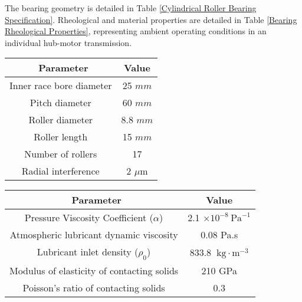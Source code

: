 The bearing geometry is detailed in Table \ref{Cylindrical Roller Bearing Specification}. Rheological and material properties are detailed in Table \ref{Bearing Rheological Properties}, representing ambient operating conditions in an individual hub-motor transmission. 

\begin{table*}
	\caption{Cylindrical Roller Bearing Specification}
	\label{Cylindrical Roller Bearing Specification}
	\centering
	\renewcommand{\arraystretch}{1.5}%
	\begin{tabular}{|c|c|}
		\hline
		\ \textbf{Parameter} & \textbf{Value} \\ [0.5ex]
		\hline
		Inner race bore diameter & 25 $mm$ \\ [0.5ex]
		\hline
		Pitch diameter & 60 $mm$ \\ [0.5ex]
		\hline
		Roller diameter & 8.8 $mm$ \\ [0.5ex]
		\hline
	    Roller length & 15 $mm$ \\ [0.5ex]
		\hline
	    Number of rollers & 17 \\ [0.5ex]
		\hline
		Radial interference & 2 $\mu \mathrm{m}$ \\ [0.5ex]
		\hline
	\end{tabular}
\end{table*}

\begin{table*}
	\caption{Bearing Rheological Properties}
	\label{Bearing Rheological Properties}
	\centering
	\renewcommand{\arraystretch}{1.5}%
	\begin{tabular}{|c|c|}
		\hline
		\ \textbf{Parameter} & \textbf{Value} \\ [0.5ex]
		\hline
		Pressure Viscosity Coefficient ($\alpha$) & 2.1 $\times 10^{-8}\mathrm{~Pa}^{-1}$ \\ [0.5ex]
		\hline
		Atmospheric lubricant dynamic viscosity & 0.08 Pa.s \\ [0.5ex]
		\hline
		Lubricant inlet density ($\rho_0$) & 833.8 $\mathrm{~kg}\cdot\mathrm{m}^{-3}$ \\ [0.5ex]
		\hline
		Modulus of elasticity of contacting solids & 210 GPa \\ [0.5ex]
		\hline
	    Poisson’s ratio of contacting solids & 0.3 \\ [0.5ex]
		\hline
	\end{tabular}
\end{table*}

